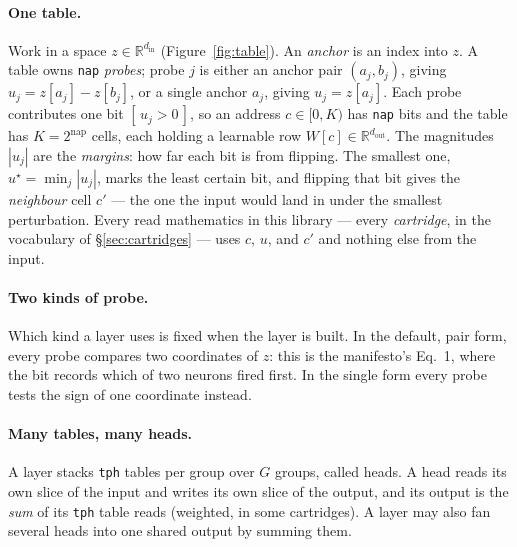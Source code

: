 \documentclass[11pt]{article}
\DeclareRobustCommand{\code}[1]{{\renewcommand{\_}{\textunderscore\allowbreak}\texttt{#1}}}
\begin{document}
\paragraph{One table.} Work in a space $z\in\mathbb{R}^{d_\text{in}}$ (Figure~\ref{fig:table}). An
\emph{anchor} is an index into $z$. A table owns \code{nap} \emph{probes}; probe $j$ is either an anchor
pair $(a_j,b_j)$, giving $u_j=z[a_j]-z[b_j]$, or a single anchor $a_j$, giving $u_j=z[a_j]$. Each probe
contributes one bit $[\,u_j>0\,]$, so an address $c\in[0,K)$ has \code{nap} bits and the table has
$K=2^{\text{nap}}$ cells, each holding a learnable row $W[c]\in\mathbb{R}^{d_\text{out}}$. The magnitudes $|u_j|$ are the
\emph{margins}: how far each bit is from flipping. The smallest one, $u^\star=\min_j|u_j|$, marks the
least certain bit, and flipping that bit gives the \emph{neighbour} cell $c'$ --- the one the input would
land in under the smallest perturbation. Every read mathematics in this library --- every
\emph{cartridge}, in the vocabulary of \S\ref{sec:cartridges} --- uses $c$, $u$, and $c'$ and nothing else
from the input.

\paragraph{Two kinds of probe.} Which kind a layer uses is fixed when the layer is built. In the default,
pair form, every probe compares two coordinates of $z$: this is the manifesto's Eq.~1, where the bit
records which of two neurons fired first. In the single form every probe tests the sign of one
coordinate instead.

\paragraph{Many tables, many heads.} A layer stacks \code{tph} tables per group over $G$ groups, called
heads. A head reads its own slice of the input and writes its own slice of the output, and its output
is the \emph{sum} of its \code{tph} table reads (weighted, in some cartridges). A layer may also fan
several heads into one shared output by summing them.
\end{document}
